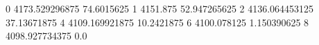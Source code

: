 0 4173.529296875 74.6015625
1 4151.875 52.947265625
2 4136.064453125 37.13671875
4 4109.169921875 10.2421875
6 4100.078125 1.150390625
8 4098.927734375 0.0
